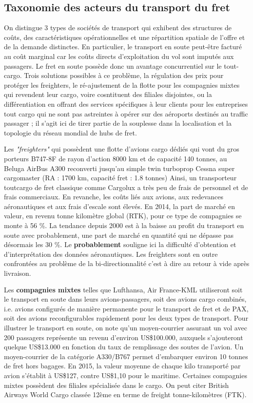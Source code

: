 \subsection{Taxonomie des acteurs du transport du fret}

On distingue 3 types de sociétés de transport qui exhibent des structures de coûts, des ca\-racté\-risti\-ques opérationnelles et une répartition spatiale de l'offre et de la demande distinctes. En particulier, le transport en soute peut-être facturé au coût marginal car les coûts directs d'exploitation du vol sont imputés aux passagers. Le fret en soute possède donc un avantage concurrentiel sur le tout-cargo. Trois solutions possibles à ce problème, la régulation des prix pour protéger les freighters, le ré-ajustement de la flotte pour les compagnies mixtes qui revendent leur cargo, voire cosntituent des filiales disjointes, ou la différentiation en offrant des services spécifiques à leur clients pour les entreprises tout cargo qui ne sont pas astreintes à opérer sur des aéroports destinés au traffic passager ; il s'agit ici de tirer partie
de la souplesse dans la localisation et la topologie du réseau mondial de hubs de fret.



Les \textit {"freighters"} qui possèdent une flotte d'avions cargo dédiés qui vont du gros porteurs B747-8F de rayon d'action 8000 km et de capacité 140 tonnes, au Beluga AirBus A300 reconverti jusqu'au simple twin turboprop Cessna super cargomaster (RA : 1700 km, capacité fret : 1.8 tonnes) Ainsi, un transporteur tout\-cargo de fret classique comme Cargolux a très peu de frais de personnel et de frais commerciaux. En revanche, les coûts liés aux avions, aux redevances aéronautiques et aux frais d’escale sont élevés. En 2014, la part de marché en valeur, en revenu tonne kilomètre global (RTK), pour ce type de compagnies se monte à 56 \%. La tendance depuis 2000 est à la baisse au profit du transport en soute avec probablement, une part de marché en quantité qui ne dépasse pas désormais les 30 \%. Le \textbf{probablement} souligne ici la difficulté d'obtention et d'interprétation des données aéronautiques. Les freighters sont en outre confrontées au problème de la bi-directionnalité c'est à dire au retour à vide après livraison. 
	
Les \textbf{compagnies mixtes} telles que Lufthansa, Air France-KML utiliseront soit le transport en soute dans leurs avions-passagers, soit des avions cargo combinés, i.e. avions configurés de manière permanente pour le transport de fret et de PAX, soit des avions reconfigurables rapidement pour les deux types de transport. Pour illustrer le transport en soute, on note qu'un moyen-courrier assurant un vol avec 200 passagers représente un revenu d’environ US\$100.000, auxquels s’ajouteront quelque US\$13.000 en fonction du taux de remplissage des soutes de l’avion. Un moyen-courrier de la catégorie A330/B767 permet d’embarquer environ 10 tonnes de fret hors bagages. En 2015, la valeur moyenne de chaque kilo transporté par avion s’établit à US\$127, contre US\$1,10 pour le maritime.
Certaines compagnies mixtes possèdent des filiales spécialisée dans le cargo. On peut citer British Airways World Cargo classée 12ème en terme de freight tonne-kilomètres (FTK).
	
